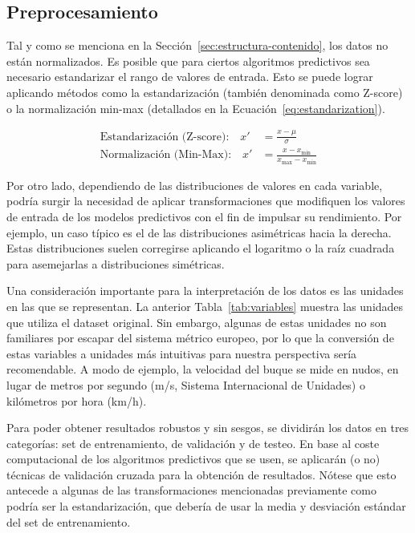 \documentclass[a4paper]{article}
\begin{document}
  \subsection{Preprocesamiento}
    Tal y como se menciona en la Sección~\ref{sec:estructura-contenido}, los datos no están normalizados. Es posible que para ciertos algoritmos predictivos sea necesario estandarizar el rango de valores de entrada. Esto se puede lograr aplicando métodos como la estandarización (también denominada como Z-score) o la normalización min-max (detallados en la Ecuación~\ref{eq:estandarization}).

    \begin{equation}
      \label{eq:estandarization}
      \begin{aligned}
      \text{Estandarización (Z-score):} \quad
      x' &= \frac{x-\mu}{\sigma} \\[10pt]
      \text{Normalización (Min-Max):} \quad
      x' &= \frac{x-x_{\min}}{x_{\max}-x_{\min}}
      \end{aligned}
    \end{equation}

  Por otro lado, dependiendo de las distribuciones de valores en cada variable, podría surgir la necesidad de aplicar transformaciones que modifiquen los valores de entrada de los modelos predictivos con el fin de impulsar su rendimiento. Por ejemplo, un caso típico es el de las distribuciones asimétricas hacia la derecha. Estas distribuciones suelen corregirse aplicando el logaritmo o la raíz cuadrada para asemejarlas a distribuciones simétricas.

  Una consideración importante para la interpretación de los datos es las unidades en las que se representan. La anterior Tabla~\ref{tab:variables} muestra las unidades que utiliza el dataset original. Sin embargo, algunas de estas unidades no son familiares por escapar del sistema métrico europeo, por lo que la conversión de estas variables a unidades más intuitivas para nuestra perspectiva sería recomendable. A modo de ejemplo, la velocidad del buque se mide en nudos, en lugar de metros por segundo (m/s, Sistema Internacional de Unidades) o kilómetros por hora (km/h).

  Para poder obtener resultados robustos y sin sesgos, se dividirán los datos en tres categorías: set de entrenamiento, de validación y de testeo. En base al coste computacional de los algoritmos predictivos que se usen, se aplicarán (o no) técnicas de validación cruzada para la obtención de resultados. Nótese que esto antecede a algunas de las transformaciones mencionadas previamente como podría ser la estandarización, que debería de usar la media y desviación estándar del set de entrenamiento.
\end{document}
